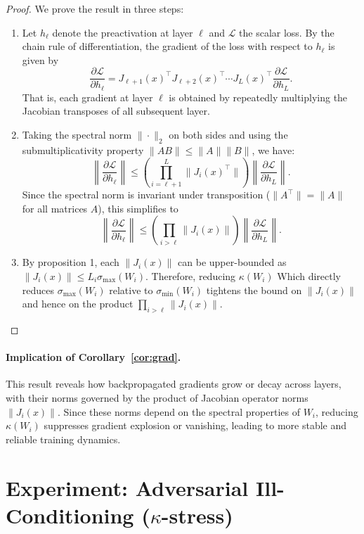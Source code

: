 \documentclass{opt2025}
\begin{document}
\begin{proof}
We prove the result in three steps:
\begin{enumerate}
\item Let $h_\ell$ denote the preactivation at layer $\ell$ and $\mathcal L$ the scalar loss. By the chain rule of differentiation, the gradient of the loss with respect to $h_\ell$ is given by
\[
\frac{\partial\mathcal L}{\partial h_\ell} = J_{\ell+1}(x)^\top J_{\ell+2}(x)^\top \cdots J_L(x)^\top\frac{\partial\mathcal L}{\partial h_L}.
\]
That is, each gradient at layer $\ell$ is obtained by repeatedly multiplying the Jacobian transposes of all subsequent layer.
\item Taking the spectral norm $\|\cdot\|_2$ on both sides and using the submultiplicativity property $\|AB\| \le \|A\|\|B\|$, we have:
\[
\left\|\frac{\partial\mathcal L}{\partial h_\ell}\right\| \le \left(\prod_{i=\ell+1}^L\|J_i(x)^\top\|\right)\left\|\frac{\partial\mathcal L}{\partial h_L}\right\|.
\]
Since the spectral norm is invariant under transposition ($\|A^\top\| = \|A\|$ for all matrices $A$), this simplifies to
\[
\left\|\frac{\partial\mathcal L}{\partial h_\ell}\right\| \le \left(\prod_{i > \ell}\|J_i(x)\|\right)\left\|\frac{\partial\mathcal{L}}{\partial h_L}\right\|.
\]
\item By proposition 1, each $\|J_i(x)\|$ can be upper-bounded as $\|J_i(x)\| \le L_i\sigma_{\max}(W_i)$. Therefore, reducing $\kappa(W_i)$ Which directly reduces $\sigma_{\max}(W_i)$ relative to $\sigma_{\min}(W_i)$ tightens the bound on $\|J_i(x)\|$ and hence on the product $\prod_{i>\ell}\|J_i(x)\|$.
\end{enumerate}
\end{proof}

\paragraph{Implication of Corollary~\ref{cor:grad}.}
This result reveals how backpropagated gradients grow or decay across layers,
with their norms governed by the product of Jacobian operator norms $\|J_i(x)\|$.
Since these norms depend on the spectral properties of $W_i$,
reducing $\kappa(W_i)$ suppresses gradient explosion or vanishing,
leading to more stable and reliable training dynamics.

\section{Experiment: Adversarial Ill-Conditioning ($\kappa$-stress)}
\label{sec:exp}
\end{document}
